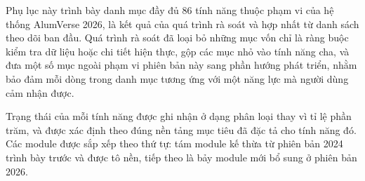 \documentclass[12pt,a4paper,oneside]{report}
\begin{document}
Phụ lục này trình bày danh mục đầy đủ 86 tính năng thuộc phạm vi của hệ thống AlumVerse 2026, là kết quả của quá trình rà soát và hợp nhất từ danh sách theo dõi ban đầu. Quá trình rà soát đã loại bỏ những mục vốn chỉ là ràng buộc kiểm tra dữ liệu hoặc chi tiết hiện thực, gộp các mục nhỏ vào tính năng cha, và đưa một số mục ngoài phạm vi phiên bản này sang phần hướng phát triển, nhằm bảo đảm mỗi dòng trong danh mục tương ứng với một năng lực mà người dùng cảm nhận được.

Trạng thái của mỗi tính năng được ghi nhận ở dạng phân loại thay vì tỉ lệ phần trăm, và được xác định theo đúng nền tảng mục tiêu đã đặc tả cho tính năng đó. Các module được sắp xếp theo thứ tự: tám module kế thừa từ phiên bản 2024 trình bày trước và được tô nền, tiếp theo là bảy module mới bổ sung ở phiên bản 2026.
\end{document}

